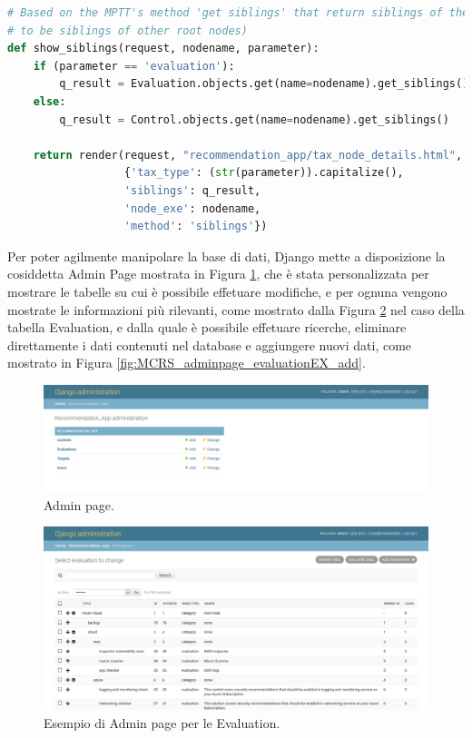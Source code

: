 \begin{lstlisting}[language=Python, caption={Parti principali del codice delle View della soluzione per gestire la navigazione 
    delle tassonomie, quella delle Evaluation e quella dei Controlli}]
# Based on the MPTT's method 'get siblings' that return siblings of the model instance (root nodes are considered
# to be siblings of other root nodes)
def show_siblings(request, nodename, parameter):
    if (parameter == 'evaluation'):
        q_result = Evaluation.objects.get(name=nodename).get_siblings()
    else:
        q_result = Control.objects.get(name=nodename).get_siblings()
    
    return render(request, "recommendation_app/tax_node_details.html",
                  {'tax_type': (str(parameter)).capitalize(),
                  'siblings': q_result,
                  'node_exe': nodename,
                  'method': 'siblings'})
\end{lstlisting}
%
Per poter agilmente manipolare la base di dati, Django mette a disposizione la cosiddetta Admin Page mostrata in 
Figura \ref{fig:MCRS_adminpage}, che è stata personalizzata per mostrare le tabelle su cui è possibile 
effetuare modifiche, e per ognuna vengono mostrate le informazioni più rilevanti, come mostrato dalla 
Figura \ref{fig:MCRS_adminpage_evaluationEX} nel caso della tabella Evaluation, e dalla quale è possibile 
effetuare ricerche, eliminare direttamente i dati contenuti nel database e aggiungere 
nuovi dati, come mostrato in Figura \ref{fig:MCRS_adminpage_evaluationEX_add}.
%
\begin{figure}
    \includegraphics[scale=0.3]{images/MCRS_adminpage.png}
    \caption{Admin page.}
    \label{fig:MCRS_adminpage}
\end{figure}
%
\begin{figure}
    \includegraphics[scale=0.3]{images/MCRS_adminpage_evaluationEX.png}
    \caption{Esempio di Admin page per le Evaluation.}
    \label{fig:MCRS_adminpage_evaluationEX}
\end{figure}
